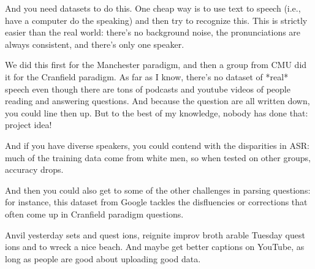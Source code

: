 And you need datasets to do this.  One cheap way is to use text to speech (i.e., have a computer do the speaking) and then try to recognize this.  This is strictly easier than the real world: there’s no background noise, the pronunciations are always consistent, and there’s only one speaker.

We did this first for the Manchester paradigm, and then a group from CMU did it for the Cranfield paradigm.  As far as I know, there’s no dataset of *real* speech even though there are tons of podcasts and youtube videos of people reading and answering questions.  And because the question are all written down, you could line then up.  But to the best of my knowledge, nobody has done that: project idea!

And if you have diverse speakers, you could contend with the disparities in ASR: much of the training data come from white men, so when tested on other groups, accuracy drops.

And then you could also get to some of the other challenges in parsing questions: for instance, this dataset from Google tackles the disfluencies or corrections that often come up in Cranfield paradigm questions.

Anvil yesterday sets and quest ions, reignite improv broth arable Tuesday quest ions and to wreck a nice beach.  And maybe get better captions on YouTube, as long as people are good about uploading good data.


